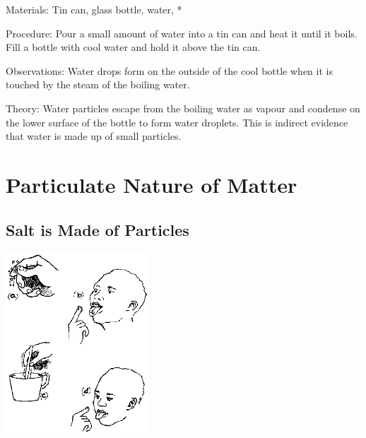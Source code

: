 \begin{multicols}{2}
\begin{description*}
\item[Materials:]{Tin can, glass bottle, water, *}
\item[Procedure:]{Pour a small amount of water into a tin can and heat it until it boils. Fill a bottle with cool water and hold it above the tin can.}
\item[Observations:]{Water drops form on the outside of the cool bottle when it is touched by the steam of the boiling water.}
\item[Theory:]{Water particles escape from the boiling water as vapour and condense on the lower surface of the bottle to form water droplets. This is indirect evidence that water is made up of small particles.}
\end{description*}


\section*{Particulate Nature of Matter}


\subsection{Salt is Made of Particles}

\begin{center}
\includegraphics[width=0.4\textwidth]{./img/source/salt-particles.png}
\end{center}


\end{multicols}
